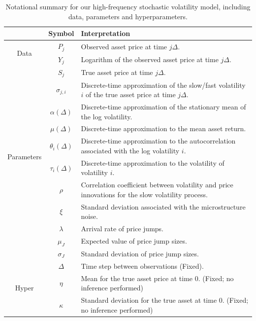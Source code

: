\begin{table}[h!]
\begin{center}
\begin{tabular}{c|c|p{10cm}}
&  Symbol   &   Interpretation  \\ \hline \hline
\multirow{2}{*}{\begin{sideways} Data \end{sideways}} &  $P_j$   &   Observed asset price at time $j\Delta$.  \\
&  $Y_j$   &   Logarithm of the observed asset price at time $j\Delta$.  \\ \hline
\multirow{10}{*}{\begin{sideways} Parameters \end{sideways}} &  $S_j$   &   True asset price at time $j\Delta$.  \\
&  $\sigma_{j,i}$   &   Discrete-time approximation of the slow/fast volatility $i$ of the true asset price at time $j\Delta$.  \\
&  $\alpha(\Delta)$   &   Discrete-time approximation of the stationary mean of the log volatility.  \\
&  $\mu(\Delta)$   &  Discrete-time approximation to the mean asset return.  \\
&  $\theta_i(\Delta)$   &  Discrete-time approximation to the autocorrelation associated with the log volatility $i$.  \\
&  $\tau_i(\Delta)$   &  Discrete-time approximation to the volatility of volatility $i$.  \\
&  $\rho$   &  Correlation coefficient between volatility and price innovations for the slow volatility process.  \\
  &  $\xi$     &   Standard deviation associated with the microstructure noise.  \\
  & $\lambda$ & Arrival rate of price jumps. \\
  & $\mu_J$ & Expected value of price jump sizes. \\
  & $\sigma_J$ & Standard deviation of price jump sizes. \\ \hline
\multirow{4}{*}{\begin{sideways} Hyper \end{sideways}} &  $\Delta$   &  Time step between observations (Fixed).  \\
&  $\eta$   &  Mean for the true asset price at time 0. (Fixed; no inference performed)  \\
&  $\kappa$   &  Standard deviation for the true asset at time 0. (Fixed; no inference performed) \\
\end{tabular}
\caption{Notational summary for our high-frequency stochastic volatility model, including data, parameters and hyperparameters.}\label{ta:parameters}
\end{center}
\end{table}

